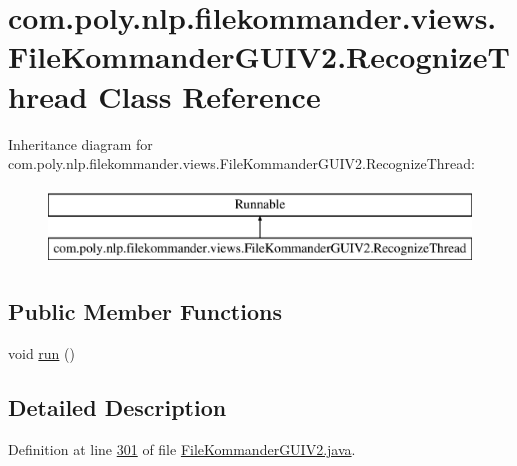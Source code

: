 \hypertarget{classcom_1_1poly_1_1nlp_1_1filekommander_1_1views_1_1_file_kommander_g_u_i_v2_1_1_recognize_thread}{\section{com.\-poly.\-nlp.\-filekommander.\-views.\-File\-Kommander\-G\-U\-I\-V2.\-Recognize\-Thread Class Reference}
\label{classcom_1_1poly_1_1nlp_1_1filekommander_1_1views_1_1_file_kommander_g_u_i_v2_1_1_recognize_thread}
}
Inheritance diagram for com.\-poly.\-nlp.\-filekommander.\-views.\-File\-Kommander\-G\-U\-I\-V2.\-Recognize\-Thread\-:\begin{figure}[H]
\begin{center}
\leavevmode
\includegraphics[height=2.000000cm]{classcom_1_1poly_1_1nlp_1_1filekommander_1_1views_1_1_file_kommander_g_u_i_v2_1_1_recognize_thread}
\end{center}
\end{figure}
\subsection*{Public Member Functions}
\begin{DoxyCompactItemize}
\item 
void \hyperlink{classcom_1_1poly_1_1nlp_1_1filekommander_1_1views_1_1_file_kommander_g_u_i_v2_1_1_recognize_thread_a4be07d48ad5b312798cd85d092a56d5f}{run} ()
\end{DoxyCompactItemize}


\subsection{Detailed Description}


Definition at line \hyperlink{L301}{301} of file \hyperlink{}{File\-Kommander\-G\-U\-I\-V2.\-java}.



